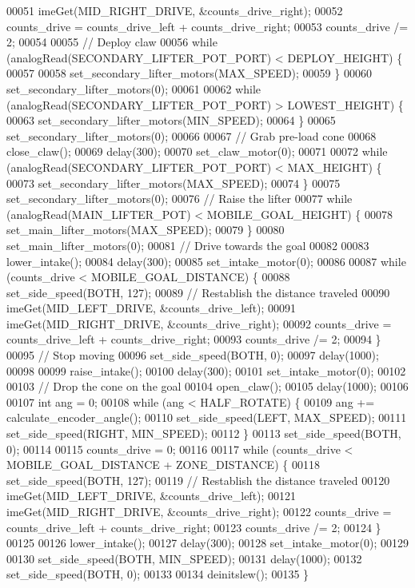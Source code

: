 \begin{DoxyCode}
00051   imeGet(MID_RIGHT_DRIVE, &counts\_drive\_right);
00052   counts\_drive = counts\_drive\_left + counts\_drive\_right;
00053   counts\_drive /= 2;
00054 
00055   \textcolor{comment}{// Deploy claw}
00056   \textcolor{keywordflow}{while} (analogRead(SECONDARY_LIFTER_POT_PORT) < DEPLOY_HEIGHT) \{
00057 
00058     set_secondary_lifter_motors(MAX_SPEED);
00059   \}
00060   set_secondary_lifter_motors(0);
00061 
00062   \textcolor{keywordflow}{while} (analogRead(SECONDARY_LIFTER_POT_PORT) > LOWEST_HEIGHT) \{
00063     set_secondary_lifter_motors(MIN_SPEED);
00064   \}
00065   set_secondary_lifter_motors(0);
00066 
00067   \textcolor{comment}{// Grab pre-load cone}
00068   close_claw();
00069   delay(300);
00070   set_claw_motor(0);
00071 
00072   \textcolor{keywordflow}{while} (analogRead(SECONDARY_LIFTER_POT_PORT) < MAX_HEIGHT) \{
00073     set_secondary_lifter_motors(MAX_SPEED);
00074   \}
00075   set_secondary_lifter_motors(0);
00076   \textcolor{comment}{// Raise the lifter}
00077   \textcolor{keywordflow}{while} (analogRead(MAIN_LIFTER_POT) < MOBILE_GOAL_HEIGHT) \{
00078     set_main_lifter_motors(MAX_SPEED);
00079   \}
00080   set_main_lifter_motors(0);
00081   \textcolor{comment}{// Drive towards the goal}
00082 
00083   lower_intake();
00084   delay(300);
00085   set_intake_motor(0);
00086 
00087   \textcolor{keywordflow}{while} (counts\_drive < MOBILE_GOAL_DISTANCE) \{
00088     set_side_speed(BOTH, 127);
00089     \textcolor{comment}{// Restablish the distance traveled}
00090     imeGet(MID_LEFT_DRIVE, &counts\_drive\_left);
00091     imeGet(MID_RIGHT_DRIVE, &counts\_drive\_right);
00092     counts\_drive = counts\_drive\_left + counts\_drive\_right;
00093     counts\_drive /= 2;
00094   \}
00095   \textcolor{comment}{// Stop moving}
00096   set_side_speed(BOTH, 0);
00097   delay(1000);
00098 
00099   raise_intake();
00100   delay(300);
00101   set_intake_motor(0);
00102 
00103   \textcolor{comment}{// Drop the cone on the goal}
00104   open_claw();
00105   delay(1000);
00106 
00107   \textcolor{keywordtype}{int} ang = 0;
00108   \textcolor{keywordflow}{while} (ang < HALF_ROTATE) \{
00109     ang += calculate_encoder_angle();
00110     set_side_speed(LEFT, MAX_SPEED);
00111     set_side_speed(RIGHT, MIN_SPEED);
00112   \}
00113   set_side_speed(BOTH, 0);
00114 
00115   counts\_drive = 0;
00116 
00117   \textcolor{keywordflow}{while} (counts\_drive < MOBILE_GOAL_DISTANCE + ZONE_DISTANCE) \{
00118     set_side_speed(BOTH, 127);
00119     \textcolor{comment}{// Restablish the distance traveled}
00120     imeGet(MID_LEFT_DRIVE, &counts\_drive\_left);
00121     imeGet(MID_RIGHT_DRIVE, &counts\_drive\_right);
00122     counts\_drive = counts\_drive\_left + counts\_drive\_right;
00123     counts\_drive /= 2;
00124   \}
00125 
00126   lower_intake();
00127   delay(300);
00128   set_intake_motor(0);
00129 
00130   set_side_speed(BOTH, MIN_SPEED);
00131   delay(1000);
00132   set_side_speed(BOTH, 0);
00133 
00134   deinitslew();
00135 \}
\end{DoxyCode}
